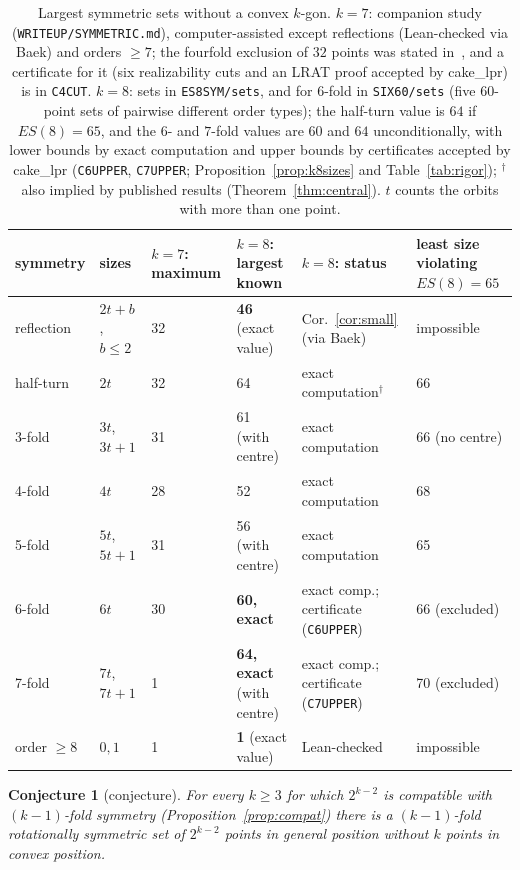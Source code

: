 \documentclass[10pt]{article}
\newtheorem{conjecture}[theorem]{Conjecture}
\theoremstyle{definition}
\theoremstyle{remark}
\begin{document}
\begin{table}[ht]
\centering\footnotesize
\begin{tabular}{@{}llllll@{}}
\toprule
symmetry & sizes & $k=7$: maximum & $k=8$: largest known & $k=8$: status & least size violating $ES(8)=65$\\
\midrule
reflection & $2t+b$, $b\le2$ & 32 & \textbf{46} (exact value) & Cor.~\ref{cor:small} (via Baek) & impossible\\
half-turn & $2t$ & 32 & 64 & exact computation$^\dagger$ & 66\\
3-fold & $3t$, $3t+1$ & 31 & 61 (with centre) & exact computation & 66 (no centre)\\
4-fold & $4t$ & 28 & 52 & exact computation & 68\\
5-fold & $5t$, $5t+1$ & 31 & 56 (with centre) & exact computation & 65\\
6-fold & $6t$ & 30 & \textbf{60, exact} & exact comp.; certificate (\texttt{C6UPPER}) & 66 (excluded)\\
7-fold & $7t$, $7t+1$ & 1 & \textbf{64, exact} (with centre) & exact comp.; certificate (\texttt{C7UPPER}) & 70 (excluded)\\
order $\ge8$ & $0,1$ & 1 & \textbf{1} (exact value) & Lean-checked & impossible\\
\bottomrule
\end{tabular}
\caption{Largest symmetric sets without a convex $k$-gon. $k=7$: companion study (\texttt{WRITEUP/SYMMETRIC.md}),
computer-assisted except reflections (Lean-checked via Baek) and orders $\ge7$; the fourfold exclusion of $32$ points
was stated in~\cite[\S6.2]{SMQH25}, and a certificate for it (six realizability cuts and an LRAT proof accepted by
cake\_lpr) is in \texttt{C4CUT}. $k=8$: sets in \texttt{ES8SYM/sets}, and for $6$-fold in \texttt{SIX60/sets} (five
$60$-point sets of pairwise different order types); the half-turn value is $64$ if $ES(8)=65$, and the $6$- and $7$-fold
values are $60$ and $64$ unconditionally, with lower bounds by exact computation and upper bounds by certificates accepted
by cake\_lpr (\texttt{C6UPPER}, \texttt{C7UPPER}; Proposition~\ref{prop:k8sizes} and Table~\ref{tab:rigor});
$^\dagger$also implied by published results (Theorem~\ref{thm:central}). $t$ counts the orbits with more than one
point.}
\label{tab:k8}
\end{table}

\begin{conjecture}[conjecture]\label{conj:primefold}
For every $k\ge3$ for which $2^{k-2}$ is compatible with $(k-1)$-fold symmetry (Proposition~\ref{prop:compat}) there is a
$(k-1)$-fold rotationally symmetric set of $2^{k-2}$ points in general position without $k$ points in convex position.
\end{conjecture}
\end{document}
